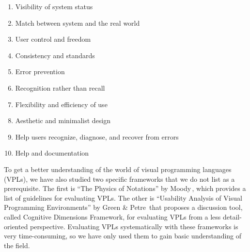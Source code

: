 \begin{enumerate}
  \item Visibility of system status
  \item Match between system and the real world
  \item User control and freedom
  \item Consistency and standards
  \item Error prevention
  \item Recognition rather than recall
  \item Flexibility and efficiency of use
  \item Aesthetic and minimalist design
  \item Help users recognize, diagnose, and recover from errors
  \item Help and documentation
\end{enumerate}

To get a better understanding of the world of visual programming languages (VPLs), we
have also studied two specific frameworks that we do not list as a
prerequisite. The first is ``The Physics of Notations'' by Moody\,\cite{Moody:2009:NTS:1687047.1687149},
which provides a list of guidelines for evaluating VPLs. The other is ``Usability Analysis of Visual Programming Environments''
by Green \& Petre\,\cite{Green96usabilityanalysis} that proposes a discussion
tool, called Cognitive Dimensions Framework, for evaluating VPLs from a less
detail-oriented perspective. Evaluating VPLs systematically with these frameworks is very time-consuming, so we have
only used them to gain basic understanding of the field.





